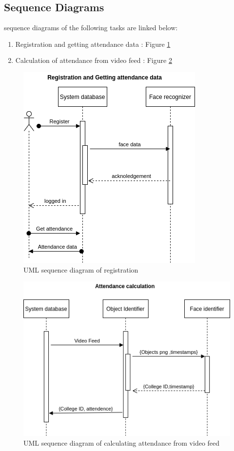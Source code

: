 \documentclass[10pt,twocolumn,letterpaper]{article}
\begin{document}
\subsection{Sequence Diagrams}
sequence diagrams of the following tasks are linked below: 
\begin{enumerate}
    \item Registration and getting attendance data  : Figure \ref{fig:reg}
    \item Calculation of attendance from video feed  : Figure \ref{fig:atten}
\end{enumerate}
\begin{figure}
    \centering
    \includegraphics[width=0.8\linewidth]
                   {sequence.png}
    \caption{UML sequence diagram of registration}
    \label{fig:reg}
\end{figure}
\begin{figure}
    \centering
    \includegraphics[width=0.8\linewidth]
                   {sequence2.png}
    \caption{UML sequence diagram of calculating attendance from video feed}
    \label{fig:atten}
\end{figure}
\end{document}
